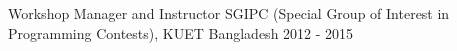 \begin{cventries}
 \cventry
    {Workshop Manager and Instructor} %
    {SGIPC (Special Group of Interest in Programming Contests), KUET} %
    {Bangladesh} %
    {2012 - 2015} %
    {}
    {}

 \vspace*{-3mm}
    
\end{cventries}
